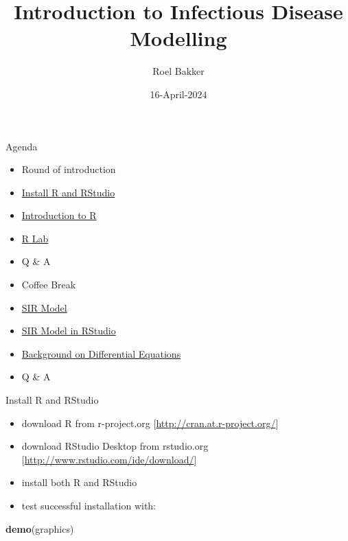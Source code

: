 \documentclass[
  ignorenonframetext,
]{beamer}
\title{Introduction to Infectious Disease Modelling}
\author{Roel Bakker}
\date{16-April-2024}
\newenvironment{Shaded}{\begin{snugshade}}{\end{snugshade}}
\newcommand{\FunctionTok}[1]{\textcolor[rgb]{0.13,0.29,0.53}{\textbf{#1}}}
\newcommand{\NormalTok}[1]{#1}
\providecommand{\tightlist}{%
  \setlength{\itemsep}{0pt}\setlength{\parskip}{0pt}}
\begin{document}
\frame{\titlepage}

\begin{frame}{Agenda}
\protect\hypertarget{agenda}{}
\begin{itemize}
\tightlist
\item
  Round of introduction
\item
  \protect\hyperlink{install-r-and-rstudio}{Install R and RStudio}
\item
  \protect\hyperlink{introduction-to-r}{Introduction to R}
\item
  \href{./R/R_lab.R}{R Lab}
\item
  Q \& A
\item
  Coffee Break
\item
  \protect\hyperlink{sir-model}{SIR Model}
\item
  \protect\hyperlink{sir-model-in-rstudio}{SIR Model in RStudio}
\item
  \protect\hyperlink{background-on-differential-equations}{Background on
  Differential Equations}
\item
  Q \& A
\end{itemize}
\end{frame}

\begin{frame}[fragile]{Install R and RStudio}
\protect\hypertarget{install-r-and-rstudio}{}
\begin{itemize}
\tightlist
\item
  download R from r-project.org
  {[}\url{http://cran.at.r-project.org/}{]}
\item
  download RStudio Desktop from rstudio.org
  {[}\url{http://www.rstudio.com/ide/download/}{]}
\item
  install both R and RStudio
\item
  test successful installation with:
\end{itemize}

\begin{Shaded}
\begin{Highlighting}[]
\FunctionTok{demo}\NormalTok{(graphics)}
\end{Highlighting}
\end{Shaded}
\end{frame}
\end{document}
